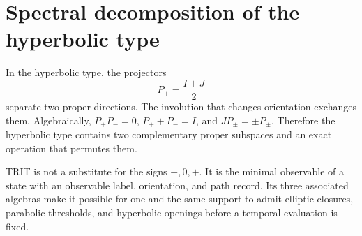 \section{Spectral decomposition of the hyperbolic type}

In the hyperbolic type, the projectors
\[
P_\pm=\frac{I\pm J}{2}
\]
separate two proper directions. The involution that changes orientation
exchanges them. Algebraically, \(P_+P_-=0\), \(P_++P_-=I\), and
\(JP_\pm=\pm P_\pm\). Therefore the hyperbolic type contains two complementary proper
subspaces and an exact operation that permutes them.

\begin{remark}
TRIT is not a substitute for the signs \(-,0,+\). It is the minimal
observable of a state with an observable label, orientation, and path
record. Its three associated algebras make it possible for one and the same
support to admit elliptic closures, parabolic thresholds, and hyperbolic
openings before a temporal evaluation is fixed.
\end{remark}
\fi
